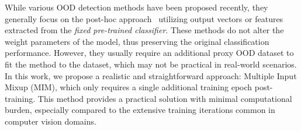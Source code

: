 \documentclass[letterpaper]{article} %
\begin{document}
While various OOD detection methods have been proposed recently, they generally focus on the post-hoc approach~\cite{MSP, mahalanobis, liang2017enhancing} utilizing output vectors or features extracted from the \textit{fixed pre-trained classifier}.
These methods do not alter the weight parameters of the model, thus preserving the original classification performance.
However, they usually require an additional proxy OOD dataset to fit the method to the dataset, which may not be practical in real-world scenarios.
In this work, we propose a realistic and straightforward approach: Multiple Input Mixup (MIM), which only requires a single additional training epoch post-training. 
This method provides a practical solution with minimal computational burden, especially compared to the extensive training iterations common in computer vision domains.
\end{document}
